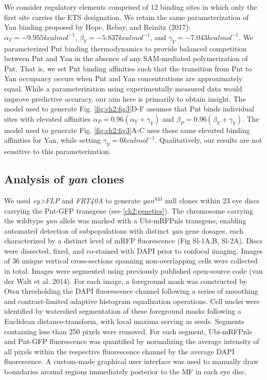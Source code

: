 We consider regulatory elements comprised of 12 binding sites in which only the first site carries the ETS designation. We retain the same parameterization of Yan binding proposed by Hope, Rebay, and Reinitz (2017): $\alpha_Y = -9.955 kcal mol^{-1}$, $\beta_Y = -5.837 kcal mol^{-1}$, and $\gamma_Y = -7.043 kcal mol^{-1}$. We parameterized Pnt binding thermodynamics to provide balanced competition between Pnt and Yan in the absence of any SAM-mediated polymerization of Pnt. That is, we set Pnt binding affinities such that the transition from Pnt to Yan occupancy occurs when Pnt and Yan concentrations are approximately equal. While a parameterization using experimentally measured data would improve predictive accuracy, our aim here is primarily to obtain insight. The model used to generate Fig. \ref{fig:ch2:fig3}D-F assumes that Pnt binds individual sites with elevated affinities $\alpha_P = 0.96 (\alpha_Y + \gamma_Y )$ and $\beta_P = 0.96 (\beta_Y + \gamma_Y )$. The model used to generate Fig. \ref{fig:ch2:fig3}A-C uses these same elevated binding affinities for Yan, while setting $\gamma_Y = 0 kcal mol^{-1}$. Qualitatively, our results are not sensitive to this parameterization. 


\subsection{Analysis of \textit{yan} clones}

We used \textit{ey>FLP} and \textit{FRT40A} to generate $yan^{833}$ null clones within 23 eye discs carrying the Pnt-GFP transgene (see \ref{ch2:genetics}). The chromosome carrying the wildtype \textit{yan} allele was marked with a Ubi-mRFPnls transgene, enabling automated detection of subpopulations with distinct \textit{yan} gene dosages, each characterized by a distinct level of mRFP fluorescence (Fig Sl-1A,B, Sl-2A). Discs were dissected, fixed, and co-stained with DAPI prior to confocal imaging. Images of 36 unique vertical cross-sections spanning non-overlapping cells were collected in total. Images were segmented using previously published open-source code (van der Walt et al. 2014). For each image, a foreground mask was constructed by Otsu thresholding the DAPI fluorescence channel following a series of smoothing and contrast-limited adaptive histogram equalization operations. Cell nuclei were identified by watershed segmentation of these foreground masks following a Euclidean distance-transform, with local maxima serving as seeds. Segments containing less than 250 pixels were removed. For each segment, Ubi-mRFPnls and Pnt-GFP fluorescence was quantified by normalizing the average intensity of all pixels within the respective fluorescence channel by the average DAPI fluorescence. A custom-made graphical user interface was used to manually draw boundaries around regions immediately posterior to the MF in each eye disc.

